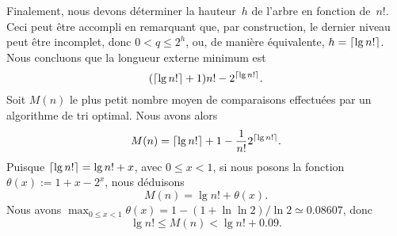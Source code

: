 Finalement, nous devons déterminer la hauteur~\(h\) de l'arbre en
fonction de~\(n!\). Ceci peut être accompli en remarquant que, par
construction, le dernier niveau peut être incomplet, donc \(0 < q
\leqslant 2^h\), ou, de manière équivalente, \(h = \lceil{\lg
  n!}\rceil\). Nous concluons que la longueur externe minimum est
\begin{equation*}
(\lceil{\lg n!}\rceil + 1) n! - 2^{\lceil{\lg n!}\rceil}.
\end{equation*}
Soit \(M(n)\) \label{def:Mn} le plus petit nombre moyen de
comparaisons effectuées par un algorithme de tri optimal. Nous avons
alors
\begin{equation*}
M(n) = \lceil{\lg n!}\rceil + 1 - \frac{1}{n!}2^{\lceil{\lg n!}\rceil}.
\end{equation*}
Puisque \(\lceil{\lg n!}\rceil = \lg n! + x\), avec \(0 \leqslant x < 1\),
si nous posons la fonction \(\theta(x) := 1 + x - 2^x\), nous
déduisons
\begin{equation*}
M(n) = \lg n! + \theta(x).
\end{equation*}
Nous avons \(\max_{0\leqslant x < 1}\theta(x) = 1 - (1 + \ln\ln
2)/\!\ln 2 \simeq 0.08607\), donc
\begin{equation}
\lg n! \leqslant M(n) < \lg n! + 0.09.
\label{ineq:Mn}
\end{equation}
